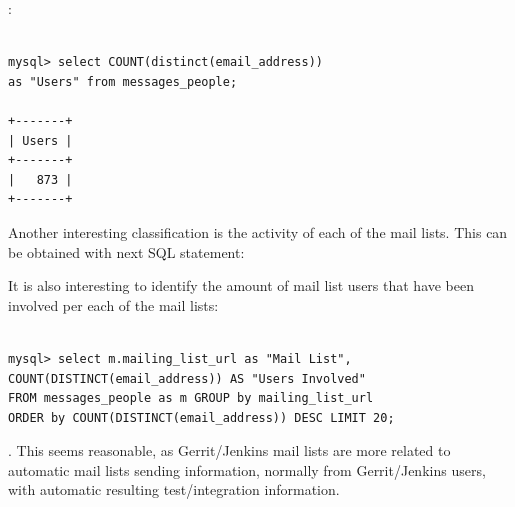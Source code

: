 \documentclass[a4paper, 12pt]{book}
\begin{document}
:

\begin{verbatim}

mysql> select COUNT(distinct(email_address))
as "Users" from messages_people;

+-------+
| Users |
+-------+
|   873 |
+-------+

\end{verbatim}
Another interesting classification is the activity of each of the mail lists. This can be obtained with next SQL statement:

It is also interesting to identify the amount of mail list users that have been involved per each of the mail lists:

\begin{verbatim}

mysql> select m.mailing_list_url as "Mail List",
COUNT(DISTINCT(email_address)) AS "Users Involved"
FROM messages_people as m GROUP by mailing_list_url
ORDER by COUNT(DISTINCT(email_address)) DESC LIMIT 20;

\end{verbatim}

. This seems reasonable, as Gerrit/Jenkins mail lists are more related to automatic mail lists sending information, normally from Gerrit/Jenkins users, with automatic resulting test/integration information.
\end{document}
